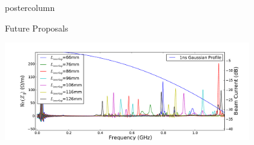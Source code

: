 \documentclass[final,hyperref={pdfpagelabels=false}]{beamer}
\begin{document}
\begin{frame}
\begin{columns}
\begin{column}{.49\textwidth}
\begin{beamercolorbox}[center,wd=\textwidth]{postercolumn}
\begin{minipage}[T]{.95\textwidth}
{\begin{block}{Future Proposals}
\begin{itemize}
\end{itemize}
\begin{center}\includegraphics[width=0.8\textwidth]{TUPRI030f6.pdf}
\end{center}
\end{block}



\vfill

          }
        \end{minipage}
      \end{beamercolorbox}
    \end{column}
  \end{columns}

\end{frame}
\end{document}
